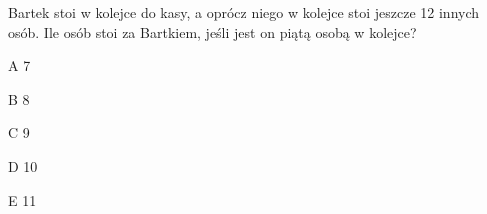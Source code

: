 \begin{tresc}
Bartek stoi w kolejce do kasy, a oprócz niego w kolejce stoi jeszcze 12 innych osób. Ile osób stoi za Bartkiem, jeśli jest on piątą osobą w kolejce?
\end{tresc}
\begin{wariant}{A} 7 \end{wariant}
\begin{wariant}{B} 8 \end{wariant}
\begin{wariant}{C} 9 \end{wariant}
\begin{wariant}{D} 10 \end{wariant}
\begin{wariant}{E} 11 \end{wariant}
